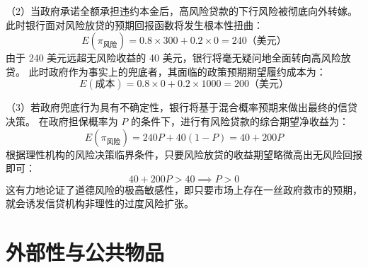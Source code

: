 \begin{enumerate}[label=\textbf{\arabic*.}, leftmargin=*]
		（2）当政府承诺全额承担违约本金后，高风险贷款的下行风险被彻底向外转嫁。
		此时银行面对风险放贷的预期回报函数将发生根本性扭曲：
		\[
		E(\pi_{\text{风险}}) = 0.8 \times 300 + 0.2 \times 0 = 240 \text{（美元）}
		\]
		由于 240 美元远超无风险收益的 40 美元，银行将毫无疑问地全面转向高风险放贷。
		此时政府作为事实上的兜底者，其面临的政策预期期望履约成本为：
		\[
		E(\text{成本}) = 0.8 \times 0 + 0.2 \times 1000 = 200 \text{（美元）}
		\]
		
		（3）若政府兜底行为具有不确定性，银行将基于混合概率预期来做出最终的信贷决策。
		在政府担保概率为 $P$ 的条件下，进行有风险贷款的综合期望净收益为：
		\[
		E(\pi_{\text{风险}}) = 240P + 40(1 - P) = 40 + 200P
		\]
		根据理性机构的风险决策临界条件，只要风险放贷的收益期望略微高出无风险回报即可：
		\[
		40 + 200P > 40 \implies P > 0
		\]
		这有力地论证了道德风险的极高敏感性，即只要市场上存在一丝政府救市的预期，就会诱发信贷机构非理性的过度风险扩张。
	\end{enumerate}
	
	\chapter{外部性与公共物品}
	
